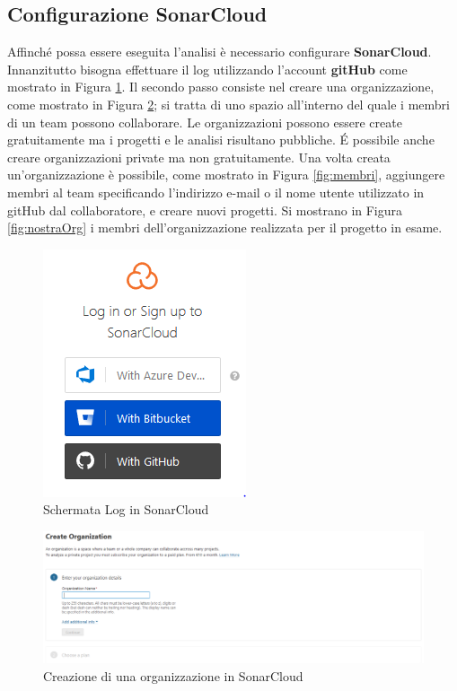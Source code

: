 \subsection{Configurazione SonarCloud}
Affinché possa essere eseguita l'analisi è necessario configurare \textbf{SonarCloud}. Innanzitutto bisogna effettuare il log utilizzando l'account \textbf{gitHub} come mostrato in Figura \ref{fig:login}. Il secondo passo consiste nel creare una organizzazione, come mostrato in Figura \ref{fig:organizzazione}; si tratta di uno spazio all'interno del quale i membri di un team possono collaborare. Le organizzazioni possono essere create gratuitamente ma i progetti e le analisi risultano pubbliche. \'E possibile anche creare organizzazioni private ma non gratuitamente. Una volta creata un'organizzazione è possibile, come mostrato in Figura \ref{fig:membri}, aggiungere membri al team specificando l'indirizzo e-mail o il nome utente utilizzato in gitHub dal collaboratore, e creare nuovi progetti. Si mostrano in Figura \ref{fig:nostraOrg} i membri dell'organizzazione realizzata per il progetto in esame.
\begin{figure}[htbp]
	\centering
	\includegraphics[scale=1, trim = 0cm 0cm 0cm 0cm, clip=true]{figSonarCloud/figLogInSonar.PNG}
	\caption{Schermata Log in SonarCloud}
	\label{fig:login}
\end{figure}

\begin{figure}[htbp]
	\centering
	\includegraphics[scale=0.3, trim = 0cm 0cm 0cm 0cm, clip=true]{figSonarCloud/organizzazione.PNG}
	\caption{Creazione di una organizzazione in SonarCloud}
	\label{fig:organizzazione}
\end{figure}

